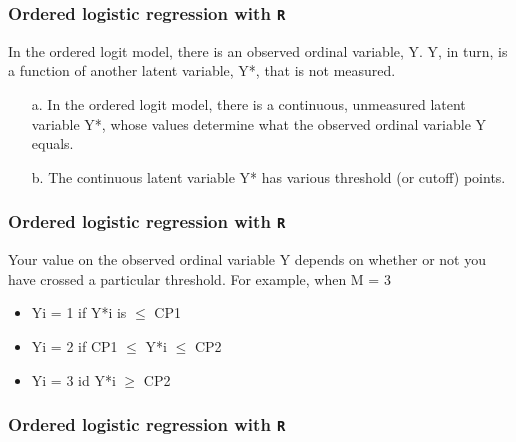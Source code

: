 \documentclass[00-GLMregslides.tex]{subfiles}
\begin{document}
\begin{frame}
\frametitle{Ordered logistic regression with \texttt{R} }
In the ordered logit model, there is an observed ordinal variable, Y.
Y, in turn, is a function of another latent variable, Y*, that is not measured.

\begin{itemize}
\item[a.] In the ordered logit model, there is a continuous, unmeasured latent variable Y*,
whose values determine what the observed ordinal variable Y equals.
\item[b.] The continuous latent variable Y* has various threshold (or cutoff) points. 
\end{itemize}


\begin{frame}
\frametitle{Ordered logistic regression with \texttt{R} }
Your value on the
observed ordinal variable Y depends on whether or not you have crossed a particular threshold. For
example, when M = 3
\begin{itemize}
\item Yi = 1 if Y*i is $ \le $ CP1
\item Yi = 2 if CP1 $ \le $ Y*i $ \le $ CP2
\item Yi = 3 id Y*i $ \ge $ CP2
\end{itemize}
\end{frame}
\begin{frame}[fragile]
	\frametitle{Ordered logistic regression with \texttt{R} }
	\Large


\end{frame}
\end{frame}
\end{document}
